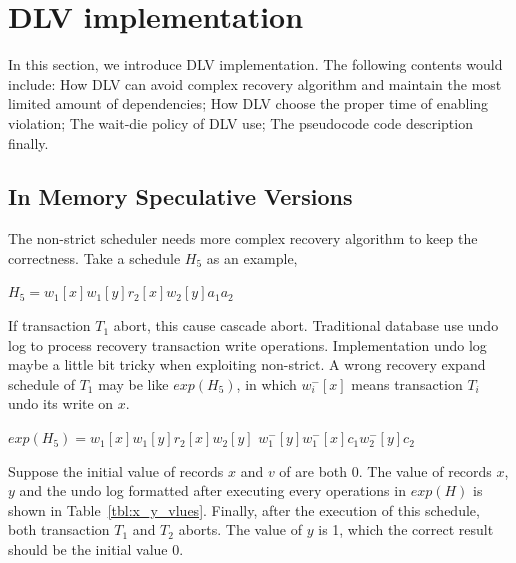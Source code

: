 \documentclass[conference]{IEEEtran}
\begin{document}
\section{DLV implementation}
\label{sec:implement}

In this section, we introduce DLV implementation. 
The following contents would include:
How DLV can avoid complex recovery algorithm and maintain the most limited amount of dependencies;
How DLV choose the proper time of enabling violation;
The wait-die policy of DLV use;
The pseudocode code description finally.

\subsection {In Memory Speculative Versions}

The non-strict scheduler needs more complex recovery algorithm to keep the correctness.
Take a schedule ${H_5}$ as an example,

\begin{center}
${H_5 = w_1[x]w_1[y]r_2[x]w_2[y]a_1a_2}$
\end{center}

If transaction ${T_1}$ abort, this cause cascade abort.
Traditional database use undo log to process recovery transaction write operations.
Implementation undo log maybe a little bit tricky when exploiting non-strict.
A wrong recovery expand schedule of ${T_1}$ may be like ${exp(H_5)}$,
in which ${w^-_i[x]}$ means transaction ${T_i}$ undo its write on ${x}$.

\begin{center}
  ${exp(H_5) =  w_1[x]w_1[y]r_2[x]w_2[y]}$
  ${w^-_1[y]w^-_1[x]c_1w^-_2[y]c_2}$
\end{center}

Suppose the initial value of records ${x}$ and ${v}$ of are both 0. 
The value of records ${x}$, ${y}$ and the undo log formatted after executing every operations in $exp(H)$ is shown in Table~\ref{tbl:x_y_vlues}.
Finally, after the execution of this schedule, both transaction ${T_1}$ and ${T_2}$ aborts.
The value of ${y}$ is 1, which the correct result should be the initial value 0.
\end{document}
